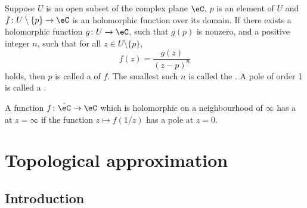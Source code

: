\begin{definition}       \label{DEFooPXYYooOMZYOT}
    Suppose \( U\) is an open subset of the complex plane \( \eC\), $p$ is an element of $U$ and \( f\colon U\setminus\{ p \}\to \eC\) is an holomorphic function  over its domain. If there exists a holomorphic function \( g\colon U\to \eC\), such that $g(p)$ is nonzero, and a positive integer $n$, such that for all \( z\in U\setminus\{ p \}\),
    \begin{equation}
        f(z)=\frac{ g(z) }{ (z-p)^n }
    \end{equation}
    holds, then $p$ is called a  of \( f\). The smallest such $n$ is called the . A pole of order 1 is called a .

    A function \( f\colon \hat \eC\to \eC\) which is holomorphic on a neighbourhood of \( \infty\) has a  at \( z=\infty\) if the function \( z\mapsto f(1/z)\) has a pole at \( z=0\).
\end{definition}

\section{Topological approximation}
\subsection{Introduction}

